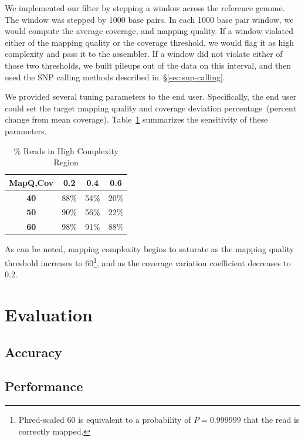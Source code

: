 \documentclass{acm_proc_article-sp}
\begin{document}
We implemented our filter by stepping a window across the reference genome. The window was stepped by 1000 base pairs. In each
1000 base pair window, we would compute the average coverage, and mapping quality. If a window violated either of the mapping
quality or the coverage threshold, we would flag it as high complexity and pass it to the assembler. If a window did not violate either
of those two thresholds, we built pileups out of the data on this interval, and then used the SNP calling methods described
in~\S\ref{sec:snp-calling}.

We provided several tuning parameters to the end user. Specifically, the end user could set the target mapping quality and coverage
deviation percentage~(percent change from mean coverage). Table~\ref{tab:filter} summarizes the sensitivity of these parameters.

\begin{table}[h]
\caption{\% Reads in High Complexity Region}
\begin{center}
\begin{tabular}{| c || c | c | c |}
\hline
\bf MapQ,Cov & \bf 0.2 & \bf 0.4 & \bf 0.6 \\
\hline
\hline
\bf 40 & 88\% & 54\% & 20\% \\
\bf 50 & 90\% & 56\% & 22\% \\
\bf 60 & 98\% & 91\% & 88\% \\
\hline 
\end{tabular}
\end{center}
\label{tab:filter}
\end{table}

As can be noted, mapping complexity begins to saturate as the mapping quality threshold increases to 60\footnote{Phred-scaled 60 is
equivalent to a probability of $P=0.999999$ that the read is correctly mapped.}, and as the coverage variation coefficient decreases to 0.2.

\section{Evaluation}
\label{sec:evaluation}


\subsection{Accuracy}
\label{sec:accuracy}


\subsection{Performance}
\label{sec:performance}
\end{document}
